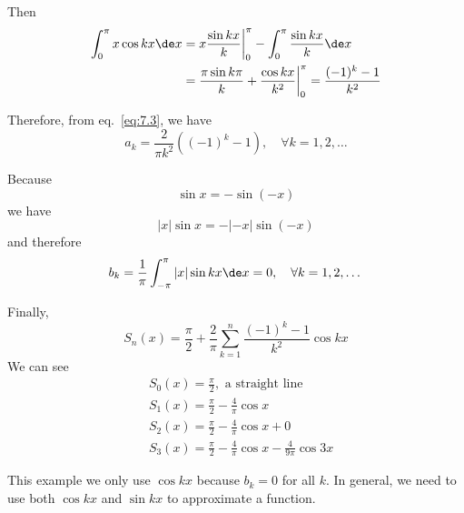 Then \begin{align*}
    \int_0^\pi x \cos kx \de x &= x \frac{\sin kx}{k} \bigg\vert_0^\pi - \int_0^\pi \frac{\sin kx}{k} \de x \\
    &= \frac{\pi \sin k\pi}{k} + \frac{\cos kx}{k^2} \bigg\vert_0^\pi = \frac{(-1)^k - 1}{k^2}
\end{align*}

Therefore, from eq.~\ref{eq:7.3}, we have \[
    a_k = \frac{2}{\pi k^2} ((-1)^k - 1), \quad \forall k=1,2,\dots
\]

Because \[
    \sin x = -\sin (-x)
\]
we have \[
    |x| \sin x = - |-x| \sin (-x)
\]
and therefore \[
    b_k = \frac{1}{\pi} \int_{-\pi}^\pi |x| \sin kx \de x = 0, \quad \forall k=1,2,\dots
\]

Finally, \[
    S_n(x) = \frac{\pi}{2} + \frac{2}{\pi} \sum_{k=1}^n \frac{(-1)^k - 1}{k^2} \cos kx
\]
We can see \begin{equation*}
\begin{split}
    & S_0(x) = \frac{\pi}{2}, \text{ a straight line}\\
    & S_1(x) = \frac{\pi}{2} - \frac{4}{\pi}
    \cos x \\
    & S_2(x) = \frac{\pi}{2} - \frac{4}{\pi}
    \cos x + 0 \\
    & S_3(x) = \frac{\pi}{2} - \frac{4}{\pi}
    \cos x - \frac{4}{9\pi} \cos 3x 
\end{split}
\end{equation*}

\begin{note}
    This example we only use $\cos kx$ because $b_k = 0$ for all $k$. In general, we need to use both $\cos kx$ and $\sin kx$ to approximate a function.
\end{note}